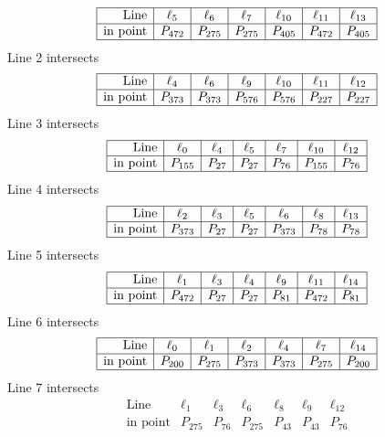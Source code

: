\documentclass{article}
\begin{document}
{$$\begin{array}{|r*{6}{|c}|}
\hline
\mbox{Line}  & \ell_{5} & \ell_{6} & \ell_{7} & \ell_{10} & \ell_{11} & \ell_{13}\\
\hline
\mbox{in point}  & P_{472} & P_{275} & P_{275} & P_{405} & P_{472} & P_{405}\\
\hline
\end{array}
$$
Line 2 intersects 
$$
\begin{array}{|r*{6}{|c}|}
\hline
\mbox{Line}  & \ell_{4} & \ell_{6} & \ell_{9} & \ell_{10} & \ell_{11} & \ell_{12}\\
\hline
\mbox{in point}  & P_{373} & P_{373} & P_{576} & P_{576} & P_{227} & P_{227}\\
\hline
\end{array}
$$
Line 3 intersects 
$$
\begin{array}{|r*{6}{|c}|}
\hline
\mbox{Line}  & \ell_{0} & \ell_{4} & \ell_{5} & \ell_{7} & \ell_{10} & \ell_{12}\\
\hline
\mbox{in point}  & P_{155} & P_{27} & P_{27} & P_{76} & P_{155} & P_{76}\\
\hline
\end{array}
$$
Line 4 intersects 
$$
\begin{array}{|r*{6}{|c}|}
\hline
\mbox{Line}  & \ell_{2} & \ell_{3} & \ell_{5} & \ell_{6} & \ell_{8} & \ell_{13}\\
\hline
\mbox{in point}  & P_{373} & P_{27} & P_{27} & P_{373} & P_{78} & P_{78}\\
\hline
\end{array}
$$
Line 5 intersects 
$$
\begin{array}{|r*{6}{|c}|}
\hline
\mbox{Line}  & \ell_{1} & \ell_{3} & \ell_{4} & \ell_{9} & \ell_{11} & \ell_{14}\\
\hline
\mbox{in point}  & P_{472} & P_{27} & P_{27} & P_{81} & P_{472} & P_{81}\\
\hline
\end{array}
$$
Line 6 intersects 
$$
\begin{array}{|r*{6}{|c}|}
\hline
\mbox{Line}  & \ell_{0} & \ell_{1} & \ell_{2} & \ell_{4} & \ell_{7} & \ell_{14}\\
\hline
\mbox{in point}  & P_{200} & P_{275} & P_{373} & P_{373} & P_{275} & P_{200}\\
\hline
\end{array}
$$
Line 7 intersects 
$$
\begin{array}{|r*{6}{|c}|}
\hline
\mbox{Line}  & \ell_{1} & \ell_{3} & \ell_{6} & \ell_{8} & \ell_{9} & \ell_{12}\\
\hline
\mbox{in point}  & P_{275} & P_{76} & P_{275} & P_{43} & P_{43} & P_{76}\\

\end{array}$$}
\end{document}
